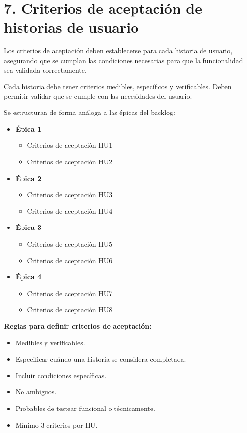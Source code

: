\documentclass[
11pt, %
]{charter}
\begin{document}
\section{7. Criterios de aceptación de historias de usuario}
\label{sec:criteriosAceptacion}

Los criterios de aceptación deben establecerse para cada historia de usuario, asegurando que se cumplan las condiciones necesarias para que la funcionalidad sea validada correctamente.

Cada historia debe tener criterios medibles, específicos y verificables. Deben permitir validar que se cumple con las necesidades del usuario.

Se estructuran de forma análoga a las \'{e}picas del backlog:

\begin{itemize}
  \item \textbf{\'{E}pica 1}
    \begin{itemize}
      \item Criterios de aceptación HU1
      \item Criterios de aceptación HU2
    \end{itemize}
  \item \textbf{\'{E}pica 2}
    \begin{itemize}
      \item Criterios de aceptación HU3
      \item Criterios de aceptación HU4
    \end{itemize}
  \item \textbf{\'{E}pica 3}
    \begin{itemize}
      \item Criterios de aceptación HU5
      \item Criterios de aceptación HU6
    \end{itemize}
  \item \textbf{\'{E}pica 4}
    \begin{itemize}
      \item Criterios de aceptación HU7
      \item Criterios de aceptación HU8
    \end{itemize}
\end{itemize}

\textbf{Reglas para definir criterios de aceptación:}
\begin{itemize}
  \item Medibles y verificables.
  \item Especificar cuándo una historia se considera completada.
  \item Incluir condiciones específicas.
  \item No ambiguos.
  \item Probables de testear funcional o técnicamente.
  \item Mínimo 3 criterios por HU.
\end{itemize}
\end{document}
